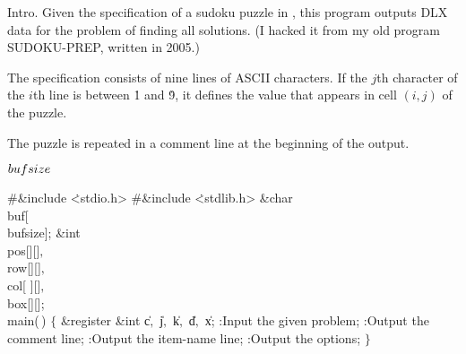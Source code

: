 

Intro. Given the specification of a sudoku puzzle in ,
this program
outputs {\mc DLX} data for the problem of finding all solutions.
(I hacked it from my old program {\mc SUDOKU-PREP}, written in 2005.)

The specification consists of nine lines of ASCII characters. If the
$j$th character of the $i$th line is between \.1 and \.9, it defines the
value that appears in cell $(i,j)$ of the puzzle.

The puzzle is repeated in a comment line at the beginning of the output.

\Y\B\4\D$\\{bufsize}$ \5
\par
\Y\B\8\#\&{include} \.{<stdio.h>}\6
\8\#\&{include} \.{<stdlib.h>}\6
\&{char} \\{buf}[\\{bufsize}];\6
\&{int} \\{pos}[][]${},{}$ \\{row}[][]${},{}$ \\{col}[%
][]${},{}$ \\{box}[][];\7
\\{main}(\,)\1\1\2\2\6
${}\{{}$\1\6
\&{register} \&{int} \|c${},{}$ \|j${},{}$ \|k${},{}$ \|d${},{}$ \|x;\7
:Input the given problem\X;\6
:Output the comment line\X;\6
:Output the item-name line\X;\6
:Output the options\X;\6
\4${}\}{}$\2\par
\fi

